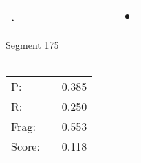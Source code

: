 \documentclass[landscape]{article}
\newcommand{\ssp}{\hspace{2pt}}
\newcommand{\mex}{\cellcolor{g}$\bullet$}
\begin{document}
\begin{tabular}{|l|p{10pt}|p{10pt}|p{10pt}|p{10pt}|p{10pt}|p{10pt}|p{10pt}|p{10pt}|p{10pt}|p{10pt}|}
\hline
\ssp \cellcolor{ref9}. \ssp&\hspace{2pt}&\hspace{2pt}&\hspace{2pt}&\hspace{2pt}&\hspace{2pt}&\hspace{2pt}&\hspace{2pt}&\hspace{2pt}&\hspace{2pt}&\hspace{2pt}\mex\\
\hline
\end{tabular}

\vspace{6pt}
\noindent Segment 175\\\\
\noindent\begin{tabular}{lm{12pt}r}
\hline
P:&&0.385\\
R:&&0.250\\
Frag:&&0.553\\
Score:&&0.118\\
\end{tabular}

\newpage
\end{document}
